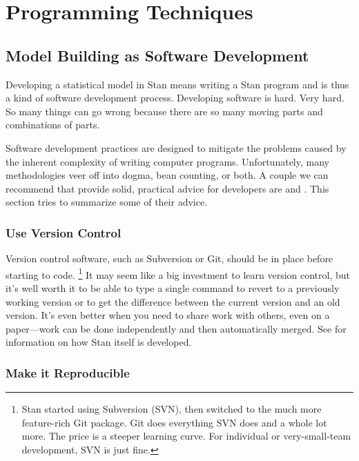 \part{Programming Techniques}\label{programming-techniques.part}


\chapter{Model Building as Software Development}

\noindent
Developing a statistical model in Stan means writing a Stan program
and is thus a kind of software development process.  Developing
software is hard.  Very hard.  So many things can go wrong because
there are so many moving parts and combinations of parts.

Software development practices are designed to mitigate the problems
caused by the inherent complexity of writing computer programs.
Unfortunately, many methodologies veer off into dogma, bean counting,
or both.  A couple we can recommend that provide solid, practical
advice for developers are \citep{HuntThomas:99} and
\citep{McConnell:2004}.  This section tries to summarize some of their
advice.

\section{Use Version Control}

Version control software, such as Subversion or Git, should be in
place before starting to code.%
%
\footnote{Stan started using Subversion (SVN), then switched to the
  much more feature-rich Git package.  Git does everything SVN does
  and a whole lot more.  The price is a steeper learning curve.  For
  individual or very-small-team development, SVN is just fine.}
%
It may seem like a big investment to learn version control, but it's
well worth it to be able to type a single command to revert to a
previously working version or to get the difference between the
current version and an old version.  It's even better when you need
to share work with others, even on a paper---work can be done
independently and then automatically merged.  See
 for information on how Stan itself
is developed.


\section{Make it Reproducible}

